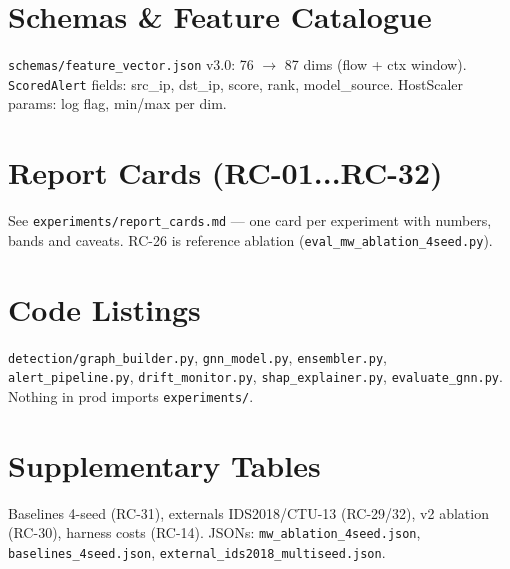 \documentclass[12pt,a4paper,oneside]{report}
\begin{document}
\appendix
\chapter{Schemas \& Feature Catalogue}
\label{app:schemas}
\texttt{schemas/feature\_vector.json} v3.0: 76 $\rightarrow$ 87 dims (flow + ctx window). \texttt{ScoredAlert} fields: src\_ip, dst\_ip, score, rank, model\_source. HostScaler params: log flag, min/max per dim.

\chapter{Report Cards (RC-01...RC-32)}
\label{app:rc}
See \texttt{experiments/report\_cards.md} — one card per experiment with numbers, bands and caveats. RC-26 is reference ablation (\texttt{eval\_mw\_ablation\_4seed.py}).

\chapter{Code Listings}
\label{app:code}
\texttt{detection/graph\_builder.py}, \texttt{gnn\_model.py}, \texttt{ensembler.py}, \texttt{alert\_pipeline.py}, \texttt{drift\_monitor.py}, \texttt{shap\_explainer.py}, \texttt{evaluate\_gnn.py}. Nothing in prod imports \texttt{experiments/}.

\chapter{Supplementary Tables}
\label{app:supp}
Baselines 4-seed (RC-31), externals IDS2018/CTU-13 (RC-29/32), v2 ablation (RC-30), harness costs (RC-14). JSONs: \texttt{mw\_ablation\_4seed.json}, \texttt{baselines\_4seed.json}, \texttt{external\_ids2018\_multiseed.json}.
\end{document}
